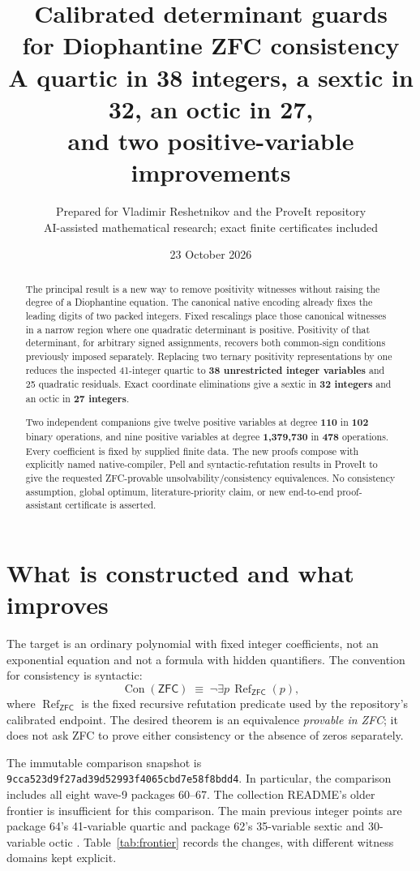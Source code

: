 \documentclass[11pt]{article}
\title{Calibrated determinant guards\\for Diophantine ZFC consistency\\[5pt]
  \large A quartic in 38 integers, a sextic in 32, an octic in 27,\\
  and two positive-variable improvements}
\author{Prepared for Vladimir Reshetnikov and the ProveIt repository\\
  \small AI-assisted mathematical research; exact finite certificates included}
\date{23 October 2026}
\theoremstyle{definition}\newtheorem{definition}[theorem]{Definition}
\theoremstyle{remark}\newtheorem{remark}[theorem]{Remark}
\newcommand{\Con}{\operatorname{Con}}
\newcommand{\RefCode}{\operatorname{Ref}}
\newcommand{\ZFC}{\mathsf{ZFC}}
\newcommand{\pin}{\texttt{9cca523d9f27ad39d52993f4065cbd7e58f8bdd4}}
\begin{document}
\maketitle
\begin{abstract}
The principal result is a new way to remove positivity witnesses without
raising the degree of a Diophantine equation. The canonical native encoding
already fixes the leading digits of two packed integers. Fixed rescalings
place those canonical witnesses in a narrow region where one quadratic
determinant is positive. Positivity of that determinant, for arbitrary
signed assignments, recovers both common-sign conditions previously imposed
separately. Replacing two ternary positivity representations by one reduces
the inspected 41-integer quartic to \textbf{38 unrestricted integer variables}
and 25 quadratic residuals. Exact coordinate eliminations give a sextic in
\textbf{32 integers} and an octic in \textbf{27 integers}.

Two independent companions give twelve positive variables at degree
\textbf{110} in \textbf{102} binary operations, and nine positive variables
at degree \textbf{1,379,730} in \textbf{478} operations. Every coefficient is
fixed by supplied finite data. The new proofs compose with explicitly named
native-compiler, Pell and syntactic-refutation results in ProveIt to give the
requested ZFC-provable unsolvability/consistency equivalences. No consistency
assumption, global optimum, literature-priority claim, or new end-to-end
proof-assistant certificate is asserted.
\end{abstract}
\clearpage
\tableofcontents
\clearpage

\section{What is constructed and what improves}
\label{sec:results}

The target is an ordinary polynomial with fixed integer coefficients,
not an exponential equation and not a formula with hidden quantifiers.
The convention for consistency is syntactic:
\[
 \Con(\ZFC)\;\equiv\;\neg\exists p\,\RefCode_{\ZFC}(p),
\]
where $\RefCode_{\ZFC}$ is the fixed recursive refutation predicate used by the
repository's calibrated endpoint. The desired theorem is an equivalence
\emph{provable in ZFC}; it does not ask ZFC to prove either consistency or
the absence of zeros separately.

The immutable comparison snapshot is \pin. In particular, the comparison
includes all eight wave-9 packages 60--67. The collection README's older
frontier is insufficient for this comparison. The main previous integer
points are package 64's 41-variable quartic and package 62's 35-variable
sextic and 30-variable octic \cite{p64,p62}. Table~\ref{tab:frontier}
records the changes, with different witness domains kept explicit.
\end{document}
